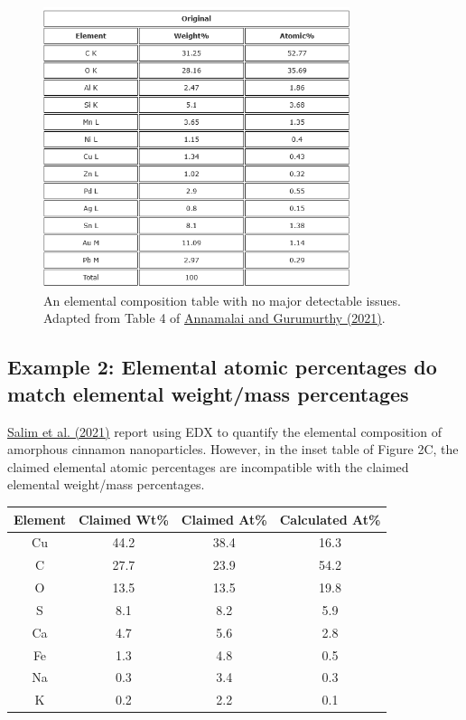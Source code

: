 \documentclass[letterpaper, 12pt]{article}
\begin{document}
\begin{figure}[h!tbp]
    \centering
    \includegraphics[width=0.8\textwidth]{img/elemental_composition/annamalai_gurumurthy_table_4.png}
    \caption*{An elemental composition table with no major detectable issues. Adapted from Table 4 of \href{https://doi.org/10.1080/10962247.2020.1813836}{Annamalai and Gurumurthy (2021)}.}
\end{figure}

\pagebreak

\subsection*{Example 2: Elemental atomic percentages do match elemental weight/mass percentages}

\href{https://doi.org/10.1016/j.photonics.2020.100889}{Salim et al. (2021)} report using EDX to quantify the elemental composition of amorphous cinnamon nanoparticles. However, in the inset table of Figure 2C, the claimed elemental atomic percentages are incompatible with the claimed elemental weight/mass percentages.

\begin{table}[h!tbp]
\begin{center}
\begin{tabular}{c|c|c|c}
Element & Claimed Wt\% 	& Claimed At\% 	& Calculated At\%\\
\hline
Cu 	& 44.2 	& 38.4 	& 16.3\\
C 	& 27.7 	& 23.9 	& 54.2\\
O 	& 13.5 	& 13.5 	& 19.8\\
S 	& 8.1 	& 8.2 	& 5.9\\
Ca 	& 4.7 	& 5.6 	& 2.8\\
Fe 	& 1.3 	& 4.8 	& 0.5\\
Na 	& 0.3 	& 3.4 	& 0.3\\
K 	& 0.2 	& 2.2 	& 0.1\\
\end{tabular}
\end{center}
\end{table}
\end{document}
